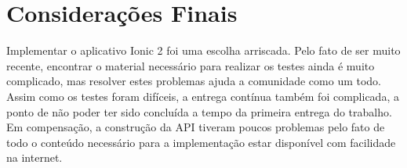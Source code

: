 \section{Considerações Finais}
Implementar o aplicativo Ionic 2 foi uma escolha arriscada. Pelo fato de ser muito recente, encontrar o material necessário para realizar os testes ainda é muito complicado, mas resolver estes problemas ajuda a comunidade como um todo. Assim como os testes foram difíceis, a entrega contínua também foi complicada, a ponto de não poder ter sido concluída a tempo da primeira entrega do trabalho. Em compensação, a construção da API tiveram poucos problemas pelo fato de todo o conteúdo necessário para a implementação estar disponível com facilidade na internet.
